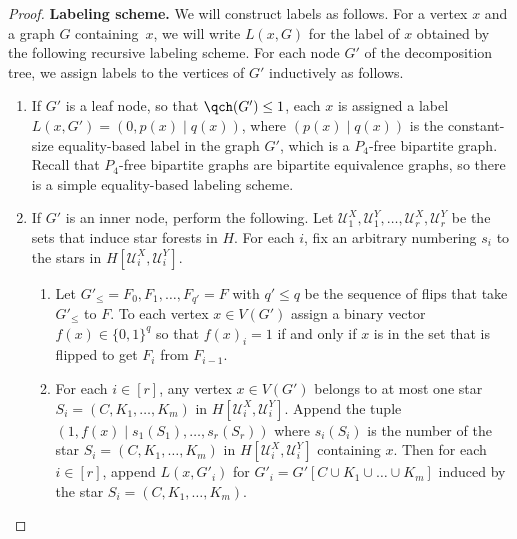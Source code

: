 \documentclass{theoretics}
\newcommand\eqLabelSep{\mathbin|}
\newcommand{\zo}{\{0,1\}}
\newcommand{\cU}{\ensuremath{\mathcal{U}}}
\begin{document}
\begin{proof}
\noindent\textbf{Labeling scheme.}
We will construct labels as follows. For a vertex $x$ and a graph $G$ containing~$x$, we will write
$L(x,G)$ for the label of $x$ obtained by the following recursive labeling scheme. For each node
$G'$ of the decomposition tree, we assign labels to the vertices of $G'$ inductively as follows.
\begin{enumerate}[topsep=4pt,parsep=0pt,partopsep=0pt]
\item If $G'$ is a leaf node, so that $\qch(G') \leq 1$, each $x$ is assigned a label $L(x,G') =
(0,p(x) \eqLabelSep q(x))$, where $(p(x) \eqLabelSep q(x))$ is the constant-size equality-based label in the graph
$G'$, which is a $P_4$-free bipartite graph. Recall that $P_4$-free bipartite graphs are bipartite
equivalence graphs, so there is a simple equality-based labeling scheme.
\item If $G'$ is an inner node, perform the following. Let $\cU^X_1,\cU^Y_1, \dotsc, \cU^X_r,\cU^Y_r$ be the sets that
induce star forests in $H$. For each $i$, fix an arbitrary numbering $s_i$ to the stars 
in $H[\cU^X_i,\cU^Y_i]$.
\begin{enumerate}[itemsep=0pt,topsep=4pt,partopsep=0pt]
\item Let $G'_\leq = F_0, F_1, \dotsc, F_{q'} = F$ with $q' \leq q$ be the sequence of flips that
take $G'_\leq$ to $F$. To each vertex $x \in V(G')$ assign a binary vector $f(x) \in \zo^q$ so that
$f(x)_i = 1$ if and only if $x$ is in the set that is flipped to get $F_i$ from $F_{i-1}$.
\item For each $i \in [r]$, any vertex $x \in V(G')$ belongs to at most one star $S_i = (C, K_1,
\dotsc, K_m)$ in $H[\cU^X_i,\cU^Y_i]$. Append the tuple $(1, f(x) \mathbin| s_1(S_1), \dotsc, s_r(S_r))$ where
$s_i(S_i)$ is the number of the star $S_i = (C, K_1, \dotsc, K_m)$ in $H[\cU^X_i,\cU^Y_i]$ containing $x$.
Then for each $i \in [r]$, append $L(x, G'_i)$ for $G'_i = G'[C \cup K_1 \cup \dotsc \cup K_m]$
induced by the star $S_i = (C,K_1, \dotsc, K_m)$.
\label{step:star}
\end{enumerate}
\end{enumerate}


\end{proof}
\end{document}
